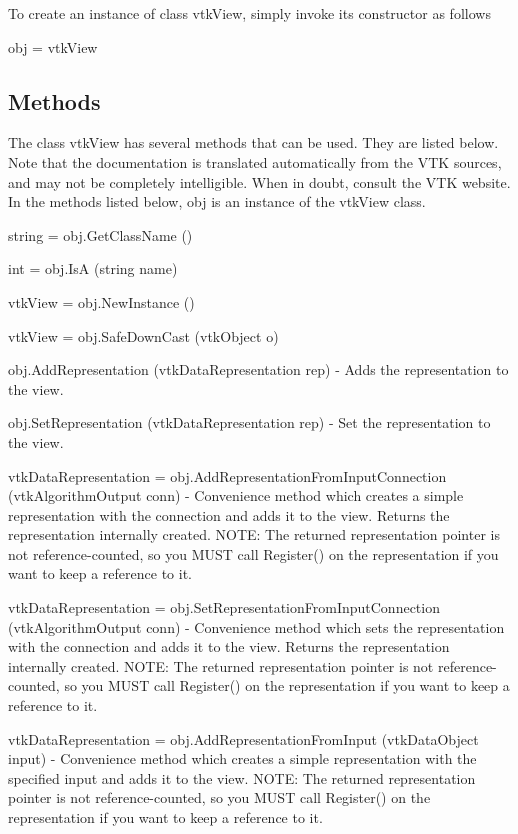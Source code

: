 To create an instance of class vtk\-View, simply invoke its constructor as follows \begin{DoxyVerb}  obj = vtkView
\end{DoxyVerb}
 \hypertarget{vtkwidgets_vtkxyplotwidget_Methods}{}\subsection{Methods}\label{vtkwidgets_vtkxyplotwidget_Methods}
The class vtk\-View has several methods that can be used. They are listed below. Note that the documentation is translated automatically from the V\-T\-K sources, and may not be completely intelligible. When in doubt, consult the V\-T\-K website. In the methods listed below, {\ttfamily obj} is an instance of the vtk\-View class. 
\begin{DoxyItemize}
\item {\ttfamily string = obj.\-Get\-Class\-Name ()}  
\item {\ttfamily int = obj.\-Is\-A (string name)}  
\item {\ttfamily vtk\-View = obj.\-New\-Instance ()}  
\item {\ttfamily vtk\-View = obj.\-Safe\-Down\-Cast (vtk\-Object o)}  
\item {\ttfamily obj.\-Add\-Representation (vtk\-Data\-Representation rep)} -\/ Adds the representation to the view.  
\item {\ttfamily obj.\-Set\-Representation (vtk\-Data\-Representation rep)} -\/ Set the representation to the view.  
\item {\ttfamily vtk\-Data\-Representation = obj.\-Add\-Representation\-From\-Input\-Connection (vtk\-Algorithm\-Output conn)} -\/ Convenience method which creates a simple representation with the connection and adds it to the view. Returns the representation internally created. N\-O\-T\-E\-: The returned representation pointer is not reference-\/counted, so you M\-U\-S\-T call Register() on the representation if you want to keep a reference to it.  
\item {\ttfamily vtk\-Data\-Representation = obj.\-Set\-Representation\-From\-Input\-Connection (vtk\-Algorithm\-Output conn)} -\/ Convenience method which sets the representation with the connection and adds it to the view. Returns the representation internally created. N\-O\-T\-E\-: The returned representation pointer is not reference-\/counted, so you M\-U\-S\-T call Register() on the representation if you want to keep a reference to it.  
\item {\ttfamily vtk\-Data\-Representation = obj.\-Add\-Representation\-From\-Input (vtk\-Data\-Object input)} -\/ Convenience method which creates a simple representation with the specified input and adds it to the view. N\-O\-T\-E\-: The returned representation pointer is not reference-\/counted, so you M\-U\-S\-T call Register() on the representation if you want to keep a reference to it.  

\end{DoxyItemize}

